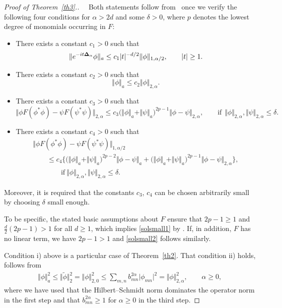\documentclass[pdftex]{sigma}
\begin{document}
\begin{proof}[Proof of Theorem~\ref{th3}.]
~~Both statements follow from~ \cite[Theorem 16]{Reed} once we verify
the following four conditions for $\alpha> 2d$ and some $\delta>0$,
where $p$ denotes the lowest degree of monomials occurring in $F$:
\begin{itemize}\itemsep=0pt
\item[i)] There exists a constant $c_1>0$ such that
\[
\Vert e^{-it{\bf{\Delta}}_\alpha}\phi\Vert_a\leq
c_1 |t|^{-d/2} \Vert\phi\Vert_{1,\alpha/2},\qquad |t|\geq 1 .
\]
\item[ii)] There exists a constant $c_2>0$ such that
\[
\Vert\phi\Vert_a\leq c_2 \Vert\phi\Vert_{2,\alpha} .
\]
\item[iii)] There  exists a constant $c_3>0$ such that
\[
\Vert\phi F(\phi^*\phi)-\psi F(\psi^*\psi)\Vert_{2,\alpha}
\leq c_3\big(\Vert\phi\Vert_a+\Vert\psi\Vert_a\big)^{2p-1}
\Vert\phi-\psi\Vert_{2,\alpha} ,\qquad \mbox{if}\ \ \Vert\phi\Vert_{2,\alpha},
\Vert\psi\Vert_{2,\alpha}\leq\delta .
\]
\item[iv)]  There  exists a constant $c_4>0$ such that
\begin{gather*}
\Vert\phi F(\phi^*\phi)-\psi F(\psi^*\psi)\Vert_{1,\alpha/2}\\
\qquad {} \leq c_4\Big\{\big(\Vert\phi\Vert_a+\Vert\psi\Vert_a\big)^{2p-2}
\Vert\phi-\psi\Vert_a
  +
\big(\Vert\phi\Vert_a+\Vert\psi\Vert_a\big)^{2p-1}
\Vert\phi-\psi\Vert_{2,\alpha}\Big\} ,\\
\qquad \qquad \mbox{if} \ \Vert\phi\Vert_{2,\alpha},
\Vert\psi\Vert_{2,\alpha}\leq\delta .
\end{gather*}
\end{itemize}
Moreover, it is required that the constants $c_3$, $c_4$ can be chosen
arbitrarily small by choosing $\delta$ small enough.

To be specif\/ic, the stated basic assumptions about $F$ ensure that
 $2p-1\geq 1$ and $\frac d2(2p-1)> 1$ for all
$d\geq 1$, which implies \eqref{solsmall1} by  \cite[Theorem
16]{Reed}. If, in addition, $F$ has no linear term, we have $2p-1>1$
and \eqref{solsmall2} follows similarly.

Condition i) above is a particular case of Theorem~\ref{th2}. That
condition ii) holds, follows from
\begin{gather*}%
\Vert\phi\Vert_a^2 \leq \Vert\widetilde\phi\Vert^2_2 = \Vert\phi\Vert_{2,0}^2 \leq
\sum_{m,n}b_{mn}^{2\alpha}\big|\phi_{mn}\big|^2 = \Vert\phi\Vert^2_{2,\alpha},\qquad \alpha\geq0,
\end{gather*}
where we have used that the Hilbert--Schmidt norm dominates the operator
norm in the f\/irst step and that $b^{2\alpha}_{mn}\geq 1$ for
$\alpha\geq 0$ in the third step.


\end{proof}
\end{document}
